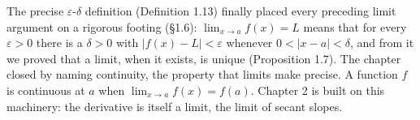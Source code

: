 \documentclass[a4paper,12pt,oneside]{memoir}
\begin{document}
The precise \(\varepsilon\)-\(\delta\) definition (Definition 1.13) finally placed every preceding limit argument on a rigorous footing (§1.6): \(\lim_{x \to a} f(x) = L\) means that for every \(\varepsilon > 0\) there is a \(\delta > 0\) with \(\lvert f(x) - L \rvert < \varepsilon\) whenever \(0 < \lvert x - a \rvert < \delta\), and from it we proved that a limit, when it exists, is unique (Proposition 1.7). The chapter closed by naming continuity, the property that limits make precise. A function \(f\) is continuous at \(a\) when \(\lim_{x \to a} f(x) = f(a)\). Chapter 2 is built on this machinery: the derivative is itself a limit, the limit of secant slopes.
\end{document}
